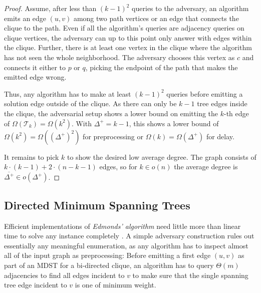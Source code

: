 \documentclass[a4paper, USenglish, cleveref, autoref, thm-restate]{lipics-v2021}
\newcommand{\maxoutdeg}{\Delta^+}
\newcommand{\avgoutdeg}{\overline{\Delta^+}}
\newcommand{\prefixtime}{\mathcal{T}_k}
\begin{document}
\begin{proof}
	Assume, after less than $(k-1)^2$ queries to the adversary, an algorithm emits an edge $(u,v)$ among two path vertices or an edge that connects the clique to the path.
	Even if all the algorithm's queries are adjacency queries on clique vertices, the adversary can up to this point only answer with edges within the clique.
	Further, there is at least one vertex in the clique where the algorithm has not seen the whole neighborhood.
	The adversary chooses this vertex as $c$ and connects it either to $p$ or $q$, picking the endpoint of the path that makes the emitted edge wrong.

	Thus, any algorithm has to make at least $(k-1)^2$ queries before emitting a solution edge outside of the clique.
	As there can only be $k-1$ tree edges inside the clique, the adversarial setup shows a lower bound on emitting the $k$-th edge of $\Omega(\prefixtime)=\Omega(k^2)$.
	With $\maxoutdeg = k-1$, this shows a lower bound of $\Omega(k^2) = \Omega((\maxoutdeg)^2)$ for preprocessing or $\Omega(k) = \Omega(\maxoutdeg)$ for delay.

	It remains to pick $k$ to show the desired low average degree.
	The graph consists of $k \cdot (k-1) + 2 \cdot (n-k-1)$ edges, so for $k \in o(n)$ the average degree is $\avgoutdeg \in o(\maxoutdeg)$.
\end{proof}

\subsection{Directed Minimum Spanning Trees}
\label{sec:dmst}

Efficient implementations of \textit{Edmonds' algorithm} need little more than linear time to solve any instance completely \cite{gabowEfficientAlgorithmsFinding1986,mendelsonMeldingPriorityQueues2006}.
A simple adversary construction rules out essentially any meaningful enumeration, as any algorithm has to inspect almost all of the input graph as preprocessing:
Before emitting a first edge $(u,v)$ as part of an MDST for a bi-directed clique, an algorithm has to query $\Theta(m)$ adjacencies to find all edges incident to $v$ to make sure that the single spanning tree edge incident to $v$ is one of minimum weight.
\end{document}
